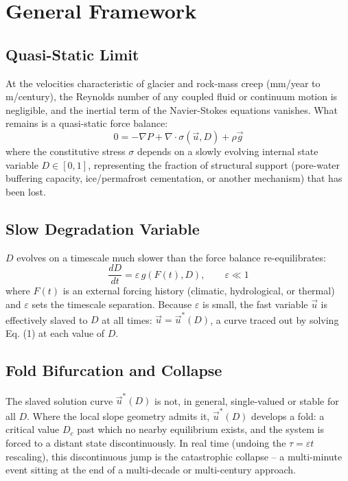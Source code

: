 \documentclass[11pt,twocolumn]{article}
\begin{document}
\section{General Framework}

\subsection{Quasi-Static Limit}
At the velocities characteristic of glacier and rock-mass creep (mm/year to m/century), the Reynolds number of any coupled fluid or continuum motion is negligible, and the inertial term of the Navier-Stokes equations vanishes. What remains is a quasi-static force balance:
\begin{equation}
0 = -\nabla P + \nabla\cdot\sigma(\vec{u}, D) + \rho\vec{g}
\end{equation}
where the constitutive stress $\sigma$ depends on a slowly evolving internal state variable $D \in [0,1]$, representing the fraction of structural support (pore-water buffering capacity, ice/permafrost cementation, or another mechanism) that has been lost.

\subsection{Slow Degradation Variable}
$D$ evolves on a timescale much slower than the force balance re-equilibrates:
\begin{equation}
\frac{dD}{dt} = \varepsilon \, g(F(t), D), \qquad \varepsilon \ll 1
\end{equation}
where $F(t)$ is an external forcing history (climatic, hydrological, or thermal) and $\varepsilon$ sets the timescale separation. Because $\varepsilon$ is small, the fast variable $\vec{u}$ is effectively slaved to $D$ at all times: $\vec{u} = \vec{u}^*(D)$, a curve traced out by solving Eq. (1) at each value of $D$.

\subsection{Fold Bifurcation and Collapse}
The slaved solution curve $\vec{u}^*(D)$ is not, in general, single-valued or stable for all $D$. Where the local slope geometry admits it, $\vec{u}^*(D)$ develops a fold: a critical value $D_c$ past which no nearby equilibrium exists, and the system is forced to a distant state discontinuously. In real time (undoing the $\tau = \varepsilon t$ rescaling), this discontinuous jump is the catastrophic collapse -- a multi-minute event sitting at the end of a multi-decade or multi-century approach.
\end{document}
